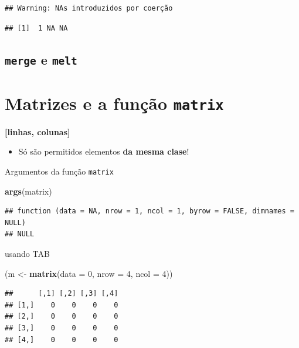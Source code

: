 \documentclass[]{book}
\newenvironment{Shaded}{\begin{snugshade}}{\end{snugshade}}
\newcommand{\KeywordTok}[1]{\textcolor[rgb]{0.13,0.29,0.53}{\textbf{#1}}}
\newcommand{\DataTypeTok}[1]{\textcolor[rgb]{0.13,0.29,0.53}{#1}}
\newcommand{\DecValTok}[1]{\textcolor[rgb]{0.00,0.00,0.81}{#1}}
\newcommand{\StringTok}[1]{\textcolor[rgb]{0.31,0.60,0.02}{#1}}
\newcommand{\NormalTok}[1]{#1}
\providecommand{\tightlist}{%
  \setlength{\itemsep}{0pt}\setlength{\parskip}{0pt}}
\theoremstyle{definition}
\theoremstyle{definition}
\theoremstyle{definition}
\theoremstyle{remark}
\begin{document}
\begin{verbatim}
## Warning: NAs introduzidos por coerção
\end{verbatim}

\begin{verbatim}
## [1]  1 NA NA
\end{verbatim}

\hypertarget{convert_df}{\subsection{\texorpdfstring{\texttt{merge} e
\texttt{melt}}{merge e melt}}\label{convert_df}}

\section{\texorpdfstring{Matrizes e a função
\texttt{matrix}}{Matrizes e a função matrix}}\label{matrizes-e-a-funcao-matrix}

\textbf{{[}linhas, colunas{]}}

\begin{itemize}
\tightlist
\item
  Só são permitidos elementos \textbf{da mesma clase}!
\end{itemize}

Argumentos da função \texttt{matrix}

\begin{Shaded}
\begin{Highlighting}[]
\KeywordTok{args}\NormalTok{(matrix)}
\end{Highlighting}
\end{Shaded}

\begin{verbatim}
## function (data = NA, nrow = 1, ncol = 1, byrow = FALSE, dimnames = NULL) 
## NULL
\end{verbatim}

usando TAB

\begin{Shaded}
\begin{Highlighting}[]
\NormalTok{(m <-}\StringTok{ }\KeywordTok{matrix}\NormalTok{(}\DataTypeTok{data =} \DecValTok{0}\NormalTok{, }\DataTypeTok{nrow =} \DecValTok{4}\NormalTok{, }\DataTypeTok{ncol =} \DecValTok{4}\NormalTok{))}
\end{Highlighting}
\end{Shaded}

\begin{verbatim}
##      [,1] [,2] [,3] [,4]
## [1,]    0    0    0    0
## [2,]    0    0    0    0
## [3,]    0    0    0    0
## [4,]    0    0    0    0
\end{verbatim}
\end{document}
